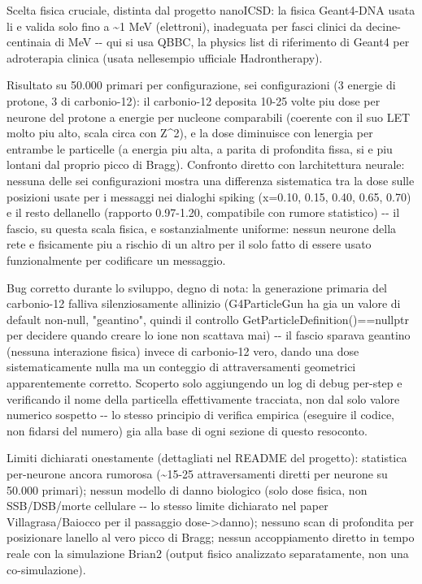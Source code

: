 \documentclass[
  italian,
]{article}
\begin{document}
Scelta fisica cruciale, distinta dal progetto nanoICSD: la fisica Geant4-DNA usata li\textquotesingle{} e\textquotesingle{} valida solo fino a \textasciitilde1 MeV (elettroni), inadeguata per fasci clinici da decine-centinaia di MeV -\/- qui si usa QBBC, la physics list di riferimento di Geant4 per adroterapia clinica (usata nell\textquotesingle esempio ufficiale Hadrontherapy).

Risultato su 50.000 primari per configurazione, sei configurazioni (3 energie di protone, 3 di carbonio-12): il carbonio-12 deposita 10-25 volte piu\textquotesingle{} dose per neurone del protone a energie per nucleone comparabili (coerente con il suo LET molto piu\textquotesingle{} alto, scala circa con Z\^{}2), e la dose diminuisce con l\textquotesingle energia per entrambe le particelle (a energia piu\textquotesingle{} alta, a parita\textquotesingle{} di profondita\textquotesingle{} fissa, si e\textquotesingle{} piu\textquotesingle{} lontani dal proprio picco di Bragg). Confronto diretto con l\textquotesingle architettura neurale: nessuna delle sei configurazioni mostra una differenza sistematica tra la dose sulle posizioni usate per i messaggi nei dialoghi spiking (x=0.10, 0.15, 0.40, 0.65, 0.70) e il resto dell\textquotesingle anello (rapporto 0.97-1.20, compatibile con rumore statistico) -\/- il fascio, su questa scala fisica, e\textquotesingle{} sostanzialmente uniforme: nessun neurone della rete e\textquotesingle{} fisicamente piu\textquotesingle{} a rischio di un altro per il solo fatto di essere usato funzionalmente per codificare un messaggio.

Bug corretto durante lo sviluppo, degno di nota: la generazione primaria del carbonio-12 falliva silenziosamente all\textquotesingle inizio (G4ParticleGun ha gia\textquotesingle{} un valore di default non-null, "geantino", quindi il controllo GetParticleDefinition()==nullptr per decidere quando creare lo ione non scattava mai) -\/- il fascio sparava geantino (nessuna interazione fisica) invece di carbonio-12 vero, dando una dose sistematicamente nulla ma un conteggio di attraversamenti geometrici apparentemente corretto. Scoperto solo aggiungendo un log di debug per-step e verificando il nome della particella effettivamente tracciata, non dal solo valore numerico sospetto -\/- lo stesso principio di verifica empirica (eseguire il codice, non fidarsi del numero) gia\textquotesingle{} alla base di ogni sezione di questo resoconto.

Limiti dichiarati onestamente (dettagliati nel README del progetto): statistica per-neurone ancora rumorosa (\textasciitilde15-25 attraversamenti diretti per neurone su 50.000 primari); nessun modello di danno biologico (solo dose fisica, non SSB/DSB/morte cellulare -\/- lo stesso limite dichiarato nel paper Villagrasa/Baiocco per il passaggio dose-\textgreater danno); nessuno scan di profondita\textquotesingle{} per posizionare l\textquotesingle anello al vero picco di Bragg; nessun accoppiamento diretto in tempo reale con la simulazione Brian2 (output fisico analizzato separatamente, non una co-simulazione).
\end{document}
